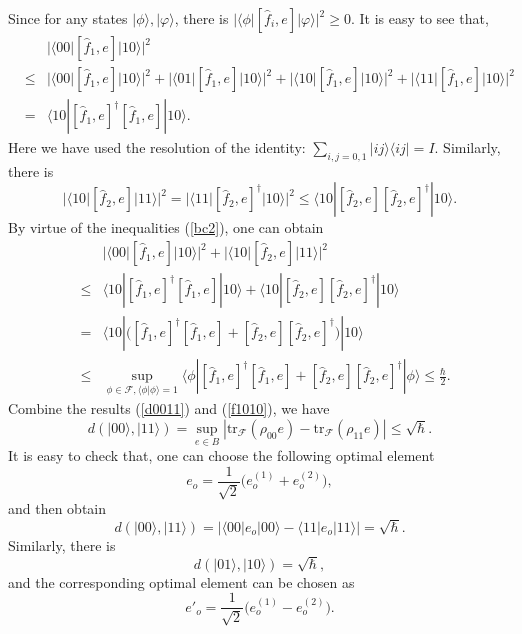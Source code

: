 \documentclass[a4paper,12pt]{article}
\begin{document}
Since for any states $|\phi\rangle,|\varphi\rangle$, there is $|\langle \phi|[\hat{f}_i,e]|\varphi\rangle|^2\geqslant 0$. It is easy to see that,
\begin{eqnarray}
	&&|\langle 00|[\hat{f}_1,e]|10\rangle|^2
	\nonumber\\
	&\leqslant&|\langle 00|[\hat{f}_1,e]|10\rangle|^2+|\langle 01|[\hat{f}_1,e]|10\rangle|^2+|\langle 10|[\hat{f}_1,e]|10\rangle|^2+|\langle 11|[\hat{f}_1,e]|10\rangle|^2\nonumber\\
	&=&\langle 10|[\hat{f}_1,e]^\dag[\hat{f}_1,e]|10\rangle.
\end{eqnarray}
Here we have used the resolution of the identity:
$\sum_{i,j=0,1}|ij\rangle \langle ij|=I$.
Similarly, there is
\begin{equation}
	|\langle 10|[\hat{f}_2,e]|11\rangle|^2=|\langle 11|[\hat{f}_2,e]^\dag|10\rangle|^2
	\leqslant\langle 10|[\hat{f}_2,e][\hat{f}_2,e]^\dag|10\rangle.
\end{equation}
By virtue of the inequalities (\ref{bc2}), one can obtain
\begin{eqnarray}\label{f1010}
	&&|\langle 00|[\hat{f}_1,e]|10\rangle|^2+|\langle 10|[\hat{f}_2,e]|11\rangle|^2
	\nonumber\\
	&\leqslant&\langle 10|[\hat{f}_1,e]^\dag[\hat{f}_1,e]|10\rangle+\langle 10|[\hat{f}_2,e][\hat{f}_2,e]^\dag|10\rangle\nonumber\\
	&=&\langle 10|\big([\hat{f}_1,e]^\dag[\hat{f}_1,e]+[\hat{f}_2,e][\hat{f}_2,e]^\dag\big)|10\rangle\nonumber\\
	&\leqslant&\!\!\!\!\sup_{\phi\in\mathcal{F},\langle\phi|\phi\rangle=1}
	\!\!\!\!\!\!\langle\phi|[\hat{f}_1,e]^\dag[\hat{f}_1,e]+[\hat{f}_2,e][\hat{f}_2,e]^\dag|\phi\rangle
	\leqslant\frac{\hbar}{2}.
\end{eqnarray}
Combine the results (\ref{d0011}) and (\ref{f1010}), we have
\begin{equation}
	d(|00\rangle, |11\rangle)
	=\sup_{e\in B}|\mathrm{tr}_\mathcal{F}(\rho_{00} e)-\mathrm{tr}_\mathcal{F}(\rho_{11} e)|
	\leqslant \sqrt{\hbar}.
\end{equation}
It is easy to check that, one can choose the following optimal element
\begin{equation}
	e_o
	=\frac{1}{\sqrt{2}}\big(e_o^{(1)}+e_o^{(2)}\big),
\end{equation}
and then obtain
\begin{equation}
	d(|00 \rangle,|11 \rangle)=|\langle 00|e_o|00\rangle-\langle 11|e_o|11\rangle|=\sqrt{\hbar}.
\end{equation}
Similarly, there is
\begin{equation}
	d(|01 \rangle,|10 \rangle)=\sqrt{\hbar},
\end{equation}
and the corresponding optimal element can be chosen as
\begin{equation}
	e'_o
	=\frac{1}{\sqrt{2}}\big(e_o^{(1)}-e_o^{(2)}\big).
\end{equation}
\end{document}
